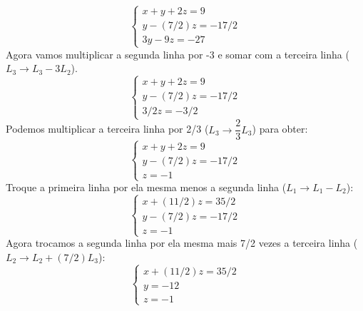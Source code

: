 \begin{exemplos}
\begin{solucao}
\begin{enumerate}[label={\arabic*})]
\[                            \begin{cases}
                                x + y + 2z = 9\\
                                y - (7/2)z = -17/2\\
                                3y - 9z = -27
                            \end{cases}
                        \]
                        Agora vamos multiplicar a segunda linha por -3 e somar com a terceira linha ($L_3 \to L_3 - 3L_2$).
                        \[
                            \begin{cases}
                                x + y + 2z = 9\\
                                y - (7/2)z = -17/2\\
                                3/2z = -3/2
                            \end{cases}
                        \]
                        Podemos multiplicar a terceira linha por 2/3 ($L_3 \to \dfrac{2}{3}L_3$) para obter:
                        \[
                            \begin{cases}
                                x + y + 2z = 9\\
                                y - (7/2)z = -17/2\\
                                z = -1
                            \end{cases}
                        \]
                        Troque a primeira linha por ela mesma menos a segunda linha ($L_1 \to L_1 - L_2$):
                        \[
                            \begin{cases}
                                x + (11/2)z = 35/2\\
                                y - (7/2)z = -17/2\\
                                z = -1
                            \end{cases}
                        \]
                        Agora trocamos a segunda linha por ela mesma mais 7/2 vezes a terceira linha ($L_2 \to L_2 + (7/2)L_3$):
                        \[
                            \begin{cases}
                                x + (11/2)z = 35/2\\
                                y  = -12\\
                                z = -1
                            \end{cases}
\]
\end{enumerate}
\end{solucao}
\end{exemplos}
